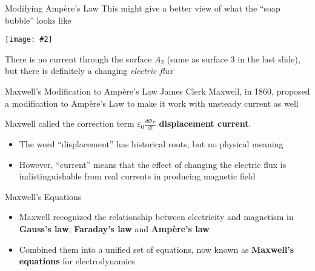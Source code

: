 \documentclass[12pt,aspectratio=169]{beamer}
\newcommand{\pic}[2]{\texttt{[image: \#2]}}\newcommand{\mb}[1]{\mathbf{#1}}
\newcommand{\eq}[2]{\vspace{#1}{\Large\begin{displaymath}#2\end{displaymath}}}
\begin{document}
\begin{frame}{Modifying Amp\`{e}re's Law}
  This might give a better view of what the ``soap bubble'' looks like
  \begin{center}
    \pic{.5}{bubble.png}
  \end{center}
  There is no current through the surface $A_2$ (same as surface \num{3} in the
  last slide), but there is definitely a changing \emph{electric flux}
\end{frame}



\begin{frame}{Maxwell's Modification to Amp\`{e}re's Law}
  James Clerk Maxwell, in 1860, proposed a modification to Amp\`{e}re's Law
  to make it work with unsteady current as well

  \eq{-.1in}{
    \boxed{
      \oint\mb{B}\cdot d\boldsymbol{\ell}=\mu_0 I +
      \mu_0\varepsilon_0 \frac{d\Phi_E}{dt}
    }
  }

  Maxwell called the correction term
  $\displaystyle \varepsilon_0\frac{d\Phi_E}{dt}$
  \textbf{displacement current}.
  \begin{itemize}
  \item The word ``displacement'' has historical roots, but no physical meaning
  \item However, ``current'' means that the effect of changing the electric
    flux is indistinguishable from real currents in producing magnetic field
  \end{itemize}
\end{frame}



\begin{frame}{Maxwell's Equations}
  \begin{itemize}
  \item Maxwell recognized the relationship between electricity and
    magnetism in \textbf{Gauss's law}, \textbf{Faraday's law} and
    \textbf{Amp\`{e}re's law}
  \item Combined them into a unified set of equations, now known as
    \textbf{Maxwell's equations} for electrodynamics
  \end{itemize}
\end{frame}
\end{document}
